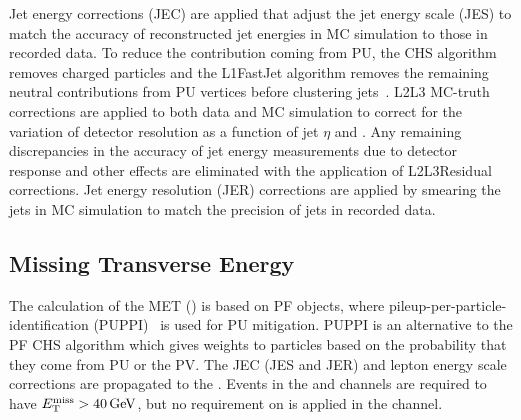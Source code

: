 Jet energy corrections (JEC) are applied that adjust the jet energy scale (JES) to match the accuracy of reconstructed jet energies in MC simulation to those in recorded data.
To reduce the contribution coming from PU, the CHS algorithm removes charged particles and the L1FastJet algorithm removes the remaining neutral contributions from PU vertices before clustering jets~\cite{bib:JME18001}.
L2L3 MC-truth corrections are applied to both data and MC simulation to correct for the variation of detector resolution as a function of jet $\eta$ and \pT.
Any remaining discrepancies in the accuracy of jet energy measurements due to detector response and other effects are eliminated with the application of L2L3Residual corrections.
Jet energy resolution (JER) corrections are applied by smearing the jets in MC simulation to match the precision of jets in recorded data.

\subsection{Missing Transverse Energy}
The calculation of the MET (\ETmiss) is based on PF objects, where pileup-per-particle-identification (PUPPI)~\cite{bib:PUPPI} is used for PU mitigation.
PUPPI is an alternative to the PF CHS algorithm which gives weights to particles based on the probability that they come from PU or the PV.
The JEC (JES and JER) and lepton energy scale corrections are propagated to the \ETmiss.
Events in the \ee and \mumu channels are required to have $\ETmiss > \SI{40}{\GeV}$, but no requirement on \ETmiss is applied in the \emu channel.

